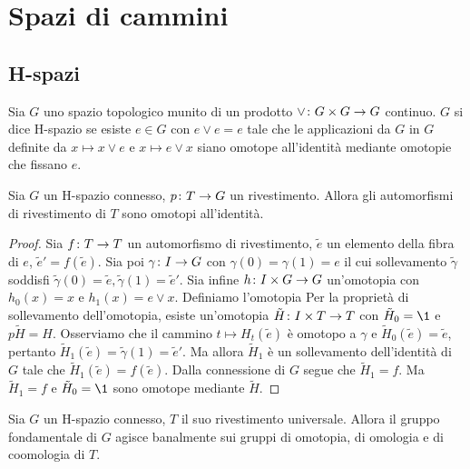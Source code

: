 \chapter{Spazi di cammini}
\section{H-spazi}
\begin{definition}
Sia $G$ uno spazio topologico munito di un prodotto $\vee\colon G\times G\to G$ continuo. $G$ si dice H-spazio se esiste $e\in G$ con $e\vee e=e$ tale che le applicazioni da $G$ in $G$ definite da $x\mapsto x\vee e$ e $x\mapsto e\vee x$ siano omotope all'identità mediante omotopie che fissano $e$.
\end{definition}
\begin{proposition}
Sia $G$ un H-spazio connesso, $p\colon T\to G$ un rivestimento. Allora gli automorfismi di rivestimento di $T$ sono omotopi all'identità.
\end{proposition}
\begin{proof}
Sia $f\colon T\to T$ un automorfismo di rivestimento, $\tilde{e}$ un elemento della fibra di $e$, $\tilde{e}'=f(\tilde{e})$. Sia poi $\gamma\colon I\to G$ con $\gamma(0)=\gamma(1)=e$ il cui sollevamento $\tilde\gamma$ soddisfi $\tilde\gamma(0)=\tilde{e},\tilde\gamma(1)=\tilde{e}'$. Sia infine $h\colon I\times G\to G$ un'omotopia con $h_0(x)=x$ e $h_1(x)=e\vee x$. Definiamo l'omotopia
Per la proprietà di sollevamento dell'omotopia, esiste un'omotopia $\tilde{H}\colon I\times T\to T$ con $\tilde{H}_0=\1$ e $p\tilde{H}=H$. Osserviamo che il cammino $t\mapsto H_t(\tilde{e})$ è omotopo a $\gamma$ e $\tilde{H}_0(\tilde{e})=\tilde{e}$, pertanto $\tilde{H}_1(\tilde{e})=\tilde{\gamma}(1)=\tilde{e}'$. Ma allora $\tilde{H}_1$ è un sollevamento dell'identità di $G$ tale che $\tilde{H}_1(\tilde{e})=f(\tilde{e})$. Dalla connessione di $G$ segue che $\tilde{H}_1=f$. Ma $\tilde{H}_1=f$ e $\tilde{H}_0=\1$ sono omotope mediante $\tilde H$.
\end{proof}
\begin{corollary}
Sia $G$ un H-spazio connesso, $T$ il suo rivestimento universale. Allora il gruppo fondamentale di $G$ agisce banalmente sui gruppi di omotopia, di omologia e di coomologia di $T$.
\end{corollary}

